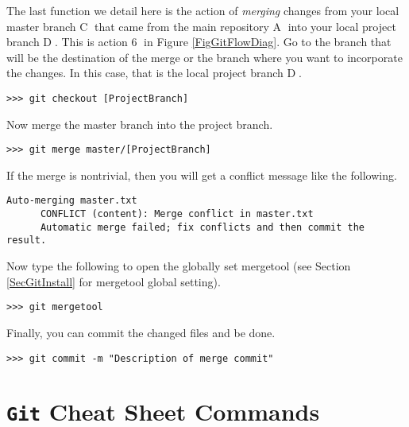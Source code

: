     The last function we detail here is the action of \textit{merging} changes from your local master branch \textcircled{C} that came from the main repository \textcircled{A} into your local project branch \textcircled{D}. This is action \textcircled{6} in Figure \ref{FigGitFlowDiag}. Go to the branch that will be the destination of the merge or the branch where you want to incorporate the changes. In this case, that is the local project branch \textcircled{D}.
    \begin{lstlisting}[frame=single]
      >>> git checkout [ProjectBranch]
    \end{lstlisting}
    Now merge the master branch into the project branch.
    \begin{lstlisting}[frame=single]
      >>> git merge master/[ProjectBranch]
    \end{lstlisting}
    If the merge is nontrivial, then you will get a conflict message like the following.
    \begin{lstlisting}[frame=single]
      Auto-merging master.txt
      CONFLICT (content): Merge conflict in master.txt
      Automatic merge failed; fix conflicts and then commit the result.
    \end{lstlisting}
    Now type the following to open the globally set \git mergetool (see Section \ref{SecGitInstall} for mergetool global setting).
    \begin{lstlisting}[frame=single]
      >>> git mergetool
    \end{lstlisting}
    Finally, you can commit the changed files and be done.
    \begin{lstlisting}[frame=single]
      >>> git commit -m "Description of merge commit"
    \end{lstlisting}


\section{\texttt{Git} Cheat Sheet Commands}\label{SecGitCheat}

